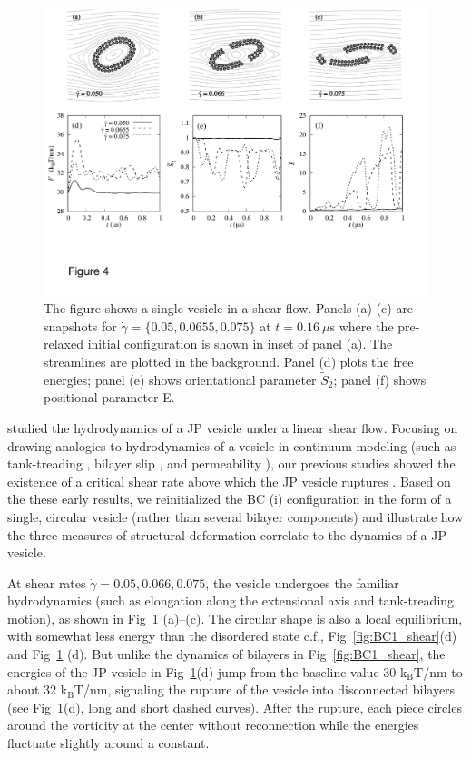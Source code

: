 \documentclass[prb,preprint,showpacs,preprintnumbers,amsmath,amssymb,longbibliography]{revtex4-1}
\begin{document}
\begin{figure}
  \begin{center}
    \includegraphics[width=1.0\textwidth]{Figures/Figure4.pdf}
  \end{center}
  \caption{
    \label{fig:Ves_shear}
The figure shows a single vesicle in a shear flow. Panels (a)-(c) are snapshots for $\dot \gamma = \{0.05, 0.0655, 0.075\}$ at $t=0.16\ \mu$s where the pre-relaxed initial configuration is shown in inset of panel (a).
The streamlines are plotted in the background.
Panel (d) plots the free energies; panel (e) shows orientational parameter $\tilde{S}_2$; panel (f) shows positional parameter E.
     }
\end{figure}
%
\citet{Fu2022_JFM} studied the hydrodynamics of a JP vesicle under a linear shear flow. 
Focusing on drawing analogies to hydrodynamics of a vesicle in continuum modeling
(such as tank-treading \cite{keller_skalak_1982,Finken08,Shaqfeh11}, bilayer slip \cite{sch-vla-mik2010,denOtter2007,Zgorski2019}, and permeability \cite{chabanon2017,qua-gan-you2021}),
our previous studies showed the existence of a critical shear
rate above which the JP vesicle ruptures
\cite{grandmaison_brancherie_salsac_2021,D2SM00179A}. 
Based on the these early results, we
reinitialized the BC (i) configuration
in the form of a single, circular vesicle (rather than several bilayer components)
and illustrate how the three measures of structural deformation 
correlate to the dynamics of a JP vesicle.

At shear rates $\dot\gamma=0.05, 0.066, 0.075$,
the vesicle undergoes the familiar hydrodynamics
(such as elongation along the extensional axis and tank-treading motion),
as shown in Fig~\ref{fig:Ves_shear} (a)--(c).
%
The circular shape is also a local equilibrium, with somewhat less
energy than the disordered state c.f.,
Fig~\ref{fig:BC1_shear}(d) and Fig~\ref{fig:Ves_shear} (d).
But unlike the dynamics of bilayers in Fig~\ref{fig:BC1_shear}, 
the energies of the JP vesicle in Fig~\ref{fig:Ves_shear}(d)
jump from the baseline value 30 $\mathrm{k_BT}$/nm to about 32 $\mathrm{k_BT}$/nm,
signaling the rupture of the vesicle into disconnected bilayers
(see Fig~\ref{fig:Ves_shear}(d), long and short dashed curves).
After the rupture, each piece circles around the vorticity at the center without reconnection while the energies fluctuate slightly around a constant.
\end{document}
